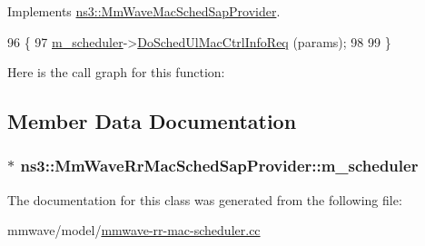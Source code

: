 Implements \hyperlink{classns3_1_1MmWaveMacSchedSapProvider_ae5d5e3e266a5ca6177960882e996a48b}{ns3\+::\+Mm\+Wave\+Mac\+Sched\+Sap\+Provider}.


\begin{DoxyCode}
96 \{
97   \hyperlink{classns3_1_1MmWaveRrMacSchedSapProvider_afb4010cfa51faa35ce50bd77dbf46e58}{m\_scheduler}->\hyperlink{classns3_1_1MmWaveRrMacScheduler_ab99149a6961ca02b605ce4c89c12e4c7}{DoSchedUlMacCtrlInfoReq} (params);
98 
99 \}
\end{DoxyCode}


Here is the call graph for this function\+:




\subsection{Member Data Documentation}
\subsubsection[{\texorpdfstring{m\+\_\+scheduler}{m_scheduler}}]{$\ast$ ns3\+::\+Mm\+Wave\+Rr\+Mac\+Sched\+Sap\+Provider\+::m\+\_\+scheduler\hspace{0.3cm}{\ttfamily [private]}}\hypertarget{classns3_1_1MmWaveRrMacSchedSapProvider_afb4010cfa51faa35ce50bd77dbf46e58}{}\label{classns3_1_1MmWaveRrMacSchedSapProvider_afb4010cfa51faa35ce50bd77dbf46e58}


The documentation for this class was generated from the following file\+:\begin{DoxyCompactItemize}
\item 
mmwave/model/\hyperlink{mmwave-rr-mac-scheduler_8cc}{mmwave-\/rr-\/mac-\/scheduler.\+cc}\end{DoxyCompactItemize}
